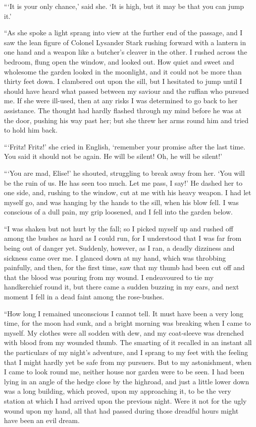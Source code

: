 \documentclass{article}
\begin{document}
```It is your only chance,' said she. `It is high, but it may be that
you can jump it.'

``As she spoke a light sprang into view at the further end of the passage,
and I saw the lean figure of Colonel Lysander Stark rushing forward with a
lantern in one hand and a weapon like a butcher's cleaver in the other. I
rushed across the bedroom, flung open the window, and looked out. How
quiet and sweet and wholesome the garden looked in the moonlight, and it
could not be more than thirty feet down. I clambered out upon the sill,
but I hesitated to jump until I should have heard what passed between
my saviour and the ruffian who pursued me. If she were ill-used, then at
any risks I was determined to go back to her assistance. The thought had
hardly flashed through my mind before he was at the door, pushing his
way past her; but she threw her arms round him and tried to hold him back.

```Fritz! Fritz!' she cried in English, `remember your promise after
the last time. You said it should not be again. He will be silent! Oh,
he will be silent!'

```You are mad, Elise!' he shouted, struggling to break away from
her. `You will be the ruin of us. He has seen too much. Let me pass,
I say!' He dashed her to one side, and, rushing to the window, cut at
me with his heavy weapon. I had let myself go, and was hanging by the
hands to the sill, when his blow fell. I was conscious of a dull pain,
my grip loosened, and I fell into the garden below.

``I was shaken but not hurt by the fall; so I picked myself up and rushed
off among the bushes as hard as I could run, for I understood that I was
far from being out of danger yet. Suddenly, however, as I ran, a deadly
dizziness and sickness came over me. I glanced down at my hand, which was
throbbing painfully, and then, for the first time, saw that my thumb had
been cut off and that the blood was pouring from my wound. I endeavoured
to tie my handkerchief round it, but there came a sudden buzzing in my
ears, and next moment I fell in a dead faint among the rose-bushes.

``How long I remained unconscious I cannot tell. It must have been a
very long time, for the moon had sunk, and a bright morning was breaking
when I came to myself. My clothes were all sodden with dew, and my
coat-sleeve was drenched with blood from my wounded thumb. The smarting
of it recalled in an instant all the particulars of my night's adventure,
and I sprang to my feet with the feeling that I might hardly yet be safe
from my pursuers. But to my astonishment, when I came to look round me,
neither house nor garden were to be seen. I had been lying in an angle
of the hedge close by the highroad, and just a little lower down was
a long building, which proved, upon my approaching it, to be the very
station at which I had arrived upon the previous night. Were it not for
the ugly wound upon my hand, all that had passed during those dreadful
hours might have been an evil dream.
\end{document}
